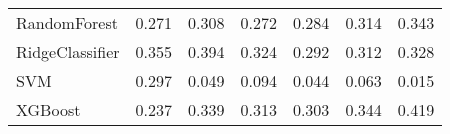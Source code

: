 \begin{tabular}{lllllll}
                   RandomForest & 0.271 &                     0.308 &                 0.272 &                  0.284 &                                   0.314 &     0.343 \\
                RidgeClassifier & 0.355 &                     0.394 &                 0.324 &                  0.292 &                                   0.312 &     0.328 \\
                            SVM & 0.297 &                     0.049 &                 0.094 &                  0.044 &                                   0.063 &     0.015 \\
                        XGBoost & 0.237 &                     0.339 &                 0.313 &                  0.303 &                                   0.344 &     0.419 \\
\bottomrule
\end{tabular}
